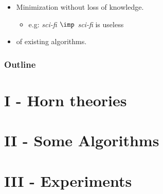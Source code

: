 \documentclass{beamer}
\begin{document}
{{\begin{frame}
\begin{itemize}
	\vspace{1.2em}
	
	\item Minimization without loss of knowledge.
	\begin{itemize}
		\item[] {\color{midnight} e.g: \textit{sci-fi $\imp$ sci-fi} is useless}
	\end{itemize}
	
	\vspace{1.2em}
	
	\item {} of existing algorithms.
\end{itemize}

\end{frame}



\begin{frame}
\frametitle{Outline}
\tableofcontents

\end{frame}
}}



\section{I - Horn theories}


\section{II - Some Algorithms}


\section{III - Experiments}

\end{document}
